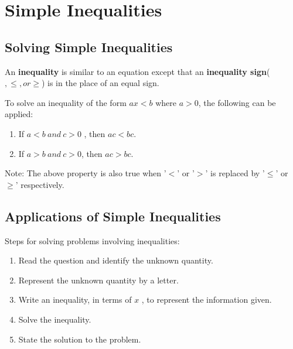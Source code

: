 \documentclass[../main]{subfiles}
\begin{document}
\section{Simple Inequalities}

\subsection{Solving Simple Inequalities}
An \textbf{inequality} is similar to an equation except that an
\textbf{inequality sign}(\(<, >, \leqslant, or \geqslant\)) is in the place of
an equal sign.

To solve an inequality of the form \(ax < b\) where \(a > 0\), the following can
be applied:
\begin{enumerate}
\item If \(a < b\ and\ c > 0\) , then \(ac < bc\).
\item If \(a > b\ and\ c >0 \), then \(ac > bc\).
  
\end{enumerate}
Note: The above property is also true when '\(<\)' or '\(>\)' is replaced by
'\(\leqslant\)' or \(\geqslant\)' respectively. 

\subsection{Applications of Simple Inequalities}
Steps for solving problems involving inequalities:
\begin{enumerate}
\item Read the question and identify the unknown quantity.
\item Represent the unknown quantity by a letter.
 
\item Write an inequality, in terms of \(x\) , to represent the information
  given.
 
\item Solve the inequality.
\item State the solution to the problem.  
\end{enumerate}
\end{document}
